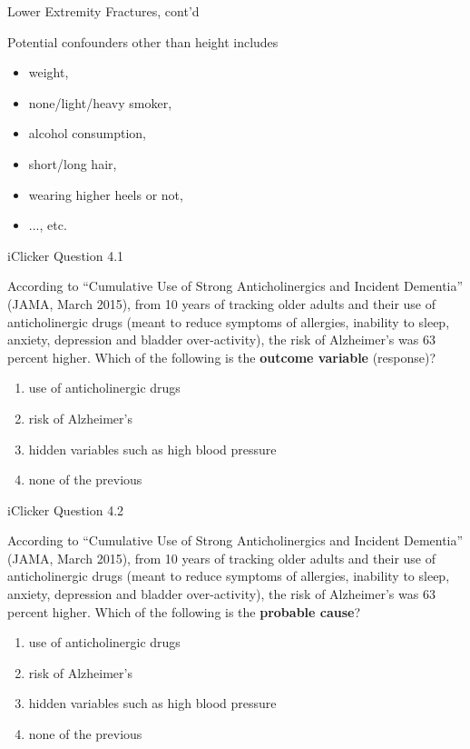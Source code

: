 \documentclass[14pt]{beamer}\usepackage[]{graphicx}\usepackage[]{color}
\begin{document}
\begin{frame}[fragile]{Lower Extremity Fractures, cont'd}

Potential confounders other than height includes 

\begin{itemize}
\item weight,  
\item none/light/heavy smoker, 
\item alcohol consumption, 
\item short/long hair,  
\item wearing higher heels or not, 
\item ..., etc.
\end{itemize}
\end{frame}

\begin{frame}[fragile]{iClicker Question 4.1}

According to ``Cumulative Use of Strong Anticholinergics and Incident  Dementia'' (JAMA, March 2015), from 10 years of tracking older adults  and their use of anticholinergic drugs (meant to reduce symptoms of  allergies, inability to sleep, anxiety, depression and bladder over-activity), the risk of Alzheimer's was 63 percent higher. Which of  the following is the \textbf{outcome variable} (response)?

\begin{enumerate}
\item use of anticholinergic drugs
\item risk of Alzheimer's
\item hidden variables such as high blood pressure
\item none of the previous
\end{enumerate}
\end{frame}

\begin{frame}[fragile]{iClicker Question 4.2}

According to ``Cumulative Use of Strong Anticholinergics and Incident  Dementia'' (JAMA, March 2015), from 10 years of tracking older adults  and their use of anticholinergic drugs (meant to reduce symptoms of  allergies, inability to sleep, anxiety, depression and bladder over-activity), the risk of Alzheimer's was 63 percent higher. Which of  the following is the \textbf{probable cause}?

\begin{enumerate}
\item use of anticholinergic drugs
\item risk of Alzheimer's
\item hidden variables such as high blood pressure
\item none of the previous
\end{enumerate}
\end{frame}
\end{document}
